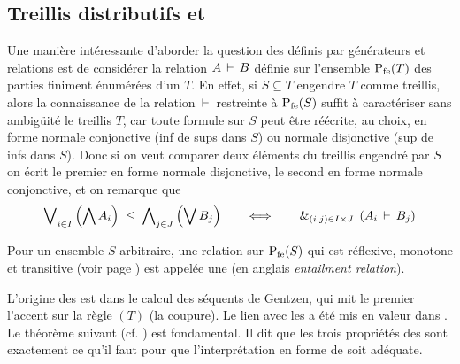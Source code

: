 \subsection{Treillis  distributifs et \entrels}
\label{subsecTrd2}
Une manière intéressante d'aborder la question des \trdis définis
par générateurs et relations est de considérer la relation
$A \,\vdash\, B$ définie sur l'ensemble ${{\rm P}_{{\rm fe}}}(T)$ des parties
finiment énumérées d'un \trdi $T$.
En effet, si $S\subseteq T$ engendre $T$ comme treillis, alors la
connaissance de la relation
$\,\vdash\,$ restreinte à ${{\rm P}_{{\rm fe}}}(S)$ suffit à caractériser sans ambigüité
le treillis $T$, car toute formule sur $S$ peut être réécrite, au
choix, en forme normale conjonctive (inf de sups dans $S$) ou normale
disjonctive (sup de infs dans $S$). Donc si on veut comparer deux
éléments du treillis engendré par $S$ on écrit le premier en forme
normale disjonctive, le second en forme normale conjonctive, et on 
remarque
que
$$ \bigvee\nolimits_{i\in I}\left(\bigwedge A_i \right)\; \leq \; \bigwedge\nolimits_{j\in J}\left(\bigvee B_j
\right)
\qquad \Longleftrightarrow\qquad  \&_{(i,j)\in I\times J}\;  \left(
A_i \,\vdash\,  B_j\right)
$$

\begin{definition}{\rm 
\label{defEntrel}
Pour un ensemble $S$ arbitraire, une relation sur  ${{\rm P}_{{\rm fe}}}(S)$  qui est
réflexive, monotone et transitive (voir page \pageref{remotr}) est
appelée une {\em \entrel} (en anglais {\em entailment relation}).
}
\end{definition}

L'origine des \entrels est dans le calcul des séquents de Gentzen, qui
mit le premier l'accent sur la règle $(T)$ (la coupure).
Le lien avec les \trdis a été mis en valeur dans \cite{cc,cp,Lor1951}.
Le théorème suivant (cf. \cite{cc,Lor1951}) est fondamental. Il dit que les
trois propriétés des \entrels sont exactement ce qu'il faut pour que
l'interprétation en forme de \trdi soit adéquate.

